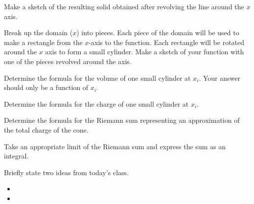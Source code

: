 \begin{problem}
\begin{subproblem}
       \item Make a sketch of the resulting solid obtained after
         revolving the line around the $x$ axis.
         \vfill

       \item Break up the domain ($x$) into pieces. Each piece of the
         domain will be used to make a rectangle from the $x$-axis to
         the function. Each rectangle will be rotated around the $x$
         axis to form a small cylinder.  Make a sketch of your
         function with one of the pieces revolved around the axis.
         \vfill

       \clearpage

       \item Determine the formula for the volume of one small cylinder at $x_i$. Your answer should only be a function of $x_i$.
         \vfill

       \item Determine the formula for the charge of one small cylinder at $x_i$.
         \vfill

       \item Determine the formula for the Riemann sum representing an
         approximation of the total charge of the cone.
         \vfill

       \item Take an appropriate limit of the Riemann sum and express
         the sum as an integral.
         \vfill

     \end{subproblem}

\end{problem}

\postClass

\begin{problem}
\item Briefly state two ideas from today's class.
  \begin{itemize}
  \item
  \item
  \end{itemize}
\item
  \begin{subproblem}
    \item
  \end{subproblem}
\end{problem}



